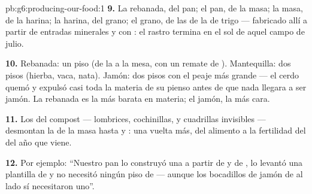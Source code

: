 \begin{solution}{pb:g6:producing-our-food:1}
\textbf{9.} La rebanada, del pan; el pan, de la masa; la masa, de la
harina; la harina, del grano; el grano, de las  de la  de
trigo --- fabricado allí a partir de entradas minerales y con : el
rastro termina en el sol de aquel campo de julio.

\textbf{10.} Rebanada: un piso (de la  a la mesa, con un
remate de ). Mantequilla: dos pisos (hierba, vaca, nata).
Jamón: dos pisos con el peaje más grande --- el cerdo quemó y expulsó
casi toda la materia de su pienso antes de que nada llegara a ser
jamón. La rebanada es la más barata en materia; el jamón, la más cara.

\textbf{11.} Los  del compost --- lombrices,
cochinillas,  y cuadrillas invisibles --- desmontan la  de la masa hasta  y : una vuelta más, del
alimento a la fertilidad del  del año que viene.

\textbf{12.} Por ejemplo: ``Nuestro pan lo construyó una  a
partir de  y de , lo levantó una plantilla de
 y no necesitó ningún piso de  --- aunque los
bocadillos de jamón de al lado sí necesitaron uno''.
\end{solution}
